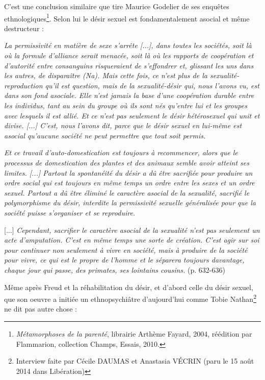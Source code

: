 C'est une conclusion similaire que tire Maurice Godelier de ses enquêtes ethnologiques\footnote{\emph{Métamorphoses de la parenté}, librairie Arthème Fayard, 2004, réédition par Flammarion, collection Champs, Essais, 2010.}.  Selon lui le désir sexuel est fondamentalement asocial et même destructeur :
 \begin{displayquote}{\emph{La permissivité en matière de sexe s'arrête \emph{[...]}, dans toutes les sociétés, soit là où la formule d'alliance serait menacée, soit là où les rapports de coopération et d'autorité entre consanguins risqueraient de s'effondrer et, glissant les uns dans les autres, de disparaître (Na). Mais cette fois, ce n'est plus de la sexualité-reproduction qu'il est question, mais de la sexualité-désir qui, nous l'avons vu, est dans son fond asociale. Elle n'est jamais la base d'une coopération durable entre les individus, tant au sein du groupe où ils sont nés qu'entre lui et les groupes avec lesquels il est allié. Et ce n'est pas seulement le désir hétérosexuel qui unit et divise. \emph{[...]} C'est, nous l'avons dit, parce que le désir sexuel en lui-même est asocial qu'aucune société ne peut permettre que tout soit permis.}
 
 \emph{Et ce travail d'auto-domestication est toujours à recommencer, alors que le processus de domestication des plantes et des animaux semble avoir atteint ses limites. \emph{[...]} Partout la spontanéité du désir a dû être sacrifiée pour produire un ordre social qui est toujours en même temps un ordre entre les sexes et un ordre sexuel. Partout a dû être éliminé le caractère asocial de la sexualité, sacrifié le polymorphisme du désir, interdite la permissivité sexuelle généralisée pour que la société puisse s'organiser et se reproduire.}
 
[...] \emph{Cependant, sacrifier le caractère asocial de la sexualité n'est pas seulement un acte d'amputation.  C'est en même temps une sorte de création. C'est agir sur soi pour continuer non seulement à vivre en société, mais à produire de la société pour vivre, ce qui est le propre de l'homme et le séparera toujours davantage, chaque jour qui passe, des primates, ses lointains cousins.} (p. 632-636)}
\end{displayquote}

Même après Freud et la réhabilitation du désir, et d'abord celle du désir sexuel, que son oeuvre a initiée un ethnopsychiâtre d'aujourd'hui  comme Tobie Nathan\footnote{Interview faite par Cécile DAUMAS et Anastasia VÉCRIN (paru le 15 août 2014 dans Libération)} ne dit pas autre chose :

